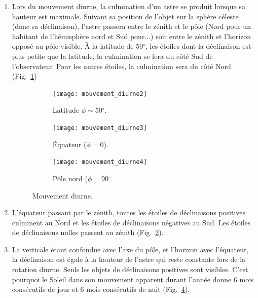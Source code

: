\documentclass[a4paper,10pt]{report}
\renewcommand{\deg}{\ensuremath{^{\circ}}}
\begin{document}
\begin{Answer}
  \begin{enumerate}
  \item Lors du mouvement diurne, la culmination d'un astre se produit
    lorsque sa hauteur est maximale.  Suivant sa position de l'objet
    sur la sphère céleste (donc sa déclinaison), l'astre passera entre
    le zénith et le pôle (Nord pour un habitant de l'hémisphère nord
    et Sud pour...) soit entre le zénith et l'horizon opposé au pôle
    visible. À la latitude de $50\deg$, les étoiles dont la
    déclinaison est plus petite que la latitude, la culmination se
    fera du côté Sud de l'observateur.  Pour les autres étoiles, la
    culmination sera du côté Nord (Fig.~\ref{mouvementdiurne2})

    \begin{figure}
      \centering
      \begin{subfigure}[b]{0.3\textwidth}
        \centering
        \texttt{[image: mouvement\_diurne2]}
        \caption{Latitude $\phi\sim 50\deg$.}
        \label{mouvementdiurne2}
      \end{subfigure}
      \begin{subfigure}[b]{0.3\textwidth}
        \centering
        \texttt{[image: mouvement\_diurne3]}
        \caption{Équateur ($\phi = 0$).}
        \label{mouvementdiurne3}
      \end{subfigure}
      \begin{subfigure}[b]{0.3\textwidth}
        \centering
        \texttt{[image: mouvement\_diurne4]}
        \caption{Pôle nord ($\phi = 90\deg$.}
        \label{mouvementdiurne4}
      \end{subfigure}
      \caption{Mouvement diurne.}
    \end{figure}

  \item L'équateur passant par le zénith, toutes les étoiles de
    déclinaisons positives culminent au Nord et les étoiles de
    déclinaisons négatives au Sud. Les étoiles de déclinaisons nulles
    passent au zénith (Fig.~\ref{mouvementdiurne3}).

  \item La verticale étant confondue avec l'axe du pôle, et l'horizon
    avec l'équateur, la déclinaison est égale à la hauteur de l'astre
    qui reste constante lors de la rotation diurne.  Seuls les objets
    de déclinaisons positives sont visibles. C'est pourquoi le Soleil
    dans son mouvement apparent durant l'année donne 6 mois
    consécutifs de jour et 6 mois consécutifs de nuit
    (Fig.~\ref{mouvementdiurne4}).
  \end{enumerate}
\end{Answer}
\end{document}
